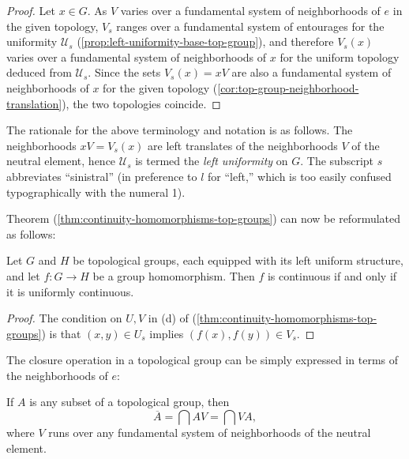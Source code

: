 \begin{proof}
    Let \( x \in G \). As \( V \) varies over a fundamental system of neighborhoods of \( e \) in the given topology, \( V_s \) ranges over a fundamental system of entourages for the uniformity \( \mathscr{U}_s \) (\ref{prop:left-uniformity-base-top-group}), and therefore \( V_s(x) \) varies over a fundamental system of neighborhoods of \( x \) for the uniform topology deduced from \( \mathscr{U}_s \). Since the sets \( V_s(x) = xV \) are also a fundamental system of neighborhoods of \( x \) for the given topology (\ref{cor:top-group-neighborhood-translation}), the two topologies coincide.
\end{proof}

\begin{remark}
    \label{rem:terminology-left-uniformity}

    The rationale for the above terminology and notation is as follows.
    The neighborhoods \( xV = V_s(x) \) are left translates of the neighborhoods \( V \) of the neutral element, hence \( \mathscr{U}_s \) is termed the \emph{left uniformity} on \( G \).
    The subscript \( s \) abbreviates “sinistral” (in preference to \( l \) for “left,” which is too easily confused typographically with the numeral 1).
\end{remark}


Theorem (\ref{thm:continuity-homomorphisms-top-groups}) can now be reformulated as follows:


\begin{theorem}
    \label{thm:homomorphism-continuous-iff-uniformly-continuous}

    Let \( G \) and \( H \) be topological groups, each equipped with its left uniform structure, and let \( f : G \to H \) be a group homomorphism. Then \( f \) is continuous if and only if it is uniformly continuous.
\end{theorem}

\begin{proof}
    The condition on \( U, V \) in (d) of (\ref{thm:continuity-homomorphisms-top-groups}) is that \( (x, y) \in U_s \) implies \( (f(x), f(y)) \in V_s \).
\end{proof}

The closure operation in a topological group can be simply expressed in terms of the neighborhoods of \( e \):

\begin{theorem}
    \label{thm:closure-properties-topological-group}

    If \( A \) is any subset of a topological group, then
    \[
        \overline{A} = \bigcap AV = \bigcap VA,
    \]
    where \( V \) runs over any fundamental system of neighborhoods of the neutral element.
\end{theorem}

